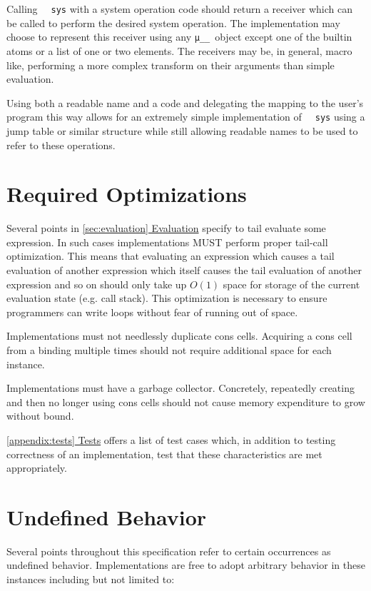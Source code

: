 \documentclass[twocolumn]{report}
\newcommand\muu{\texttt{μ\!\!\!\_\_}}
\newcommand{\intralink}[2]{\hyperref[#1]{\ref*{#1} #2}}
\begin{document}
Calling \texttt{~~sys} with a system operation code should return a receiver which can be called to perform the desired system operation.
The implementation may choose to represent this receiver using any \muu\ object except one of the builtin atoms or a list of one or two elements.
The receivers may be, in general, macro like, performing a more complex transform on their arguments than simple evaluation.

Using both a readable name and a code and delegating the mapping to the user's program this way allows for an extremely simple implementation of \texttt{~~sys} using a jump table or similar structure while still allowing readable names to be used to refer to these operations.

\section{Required Optimizations}
\label{sec:required_optimizations}

Several points in \intralink{sec:evaluation}{Evaluation} specify to tail evaluate some expression.
In such cases implementations MUST perform proper tail-call optimization.
This means that evaluating an expression which causes a tail evaluation of another expression which itself causes the tail evaluation of another expression and so on should only take up $O(1)$ space for storage of the current evaluation state (e.g. call stack).
This optimization is necessary to ensure programmers can write loops without fear of running out of space.

Implementations must not needlessly duplicate cons cells.
Acquiring a cons cell from a binding multiple times should not require additional space for each instance.

Implementations must have a garbage collector.
Concretely, repeatedly creating and then no longer using cons cells should not cause memory expenditure to grow without bound.

\intralink{appendix:tests}{Tests} offers a list of test cases which, in addition to testing correctness of an implementation, test that these characteristics are met appropriately.

\section{Undefined Behavior}
\label{sec:undefined_behavior}

Several points throughout this specification refer to certain occurrences as undefined behavior.
Implementations are free to adopt arbitrary behavior in these instances including but not limited to:
\end{document}
